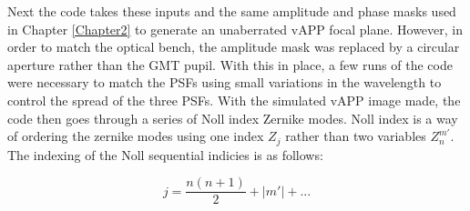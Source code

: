 Next the code takes these inputs and the same amplitude and phase masks used in Chapter \ref{Chapter2} to generate an unaberrated vAPP focal plane.  However, in order to match the optical bench, the amplitude mask was replaced by a circular aperture rather than the GMT pupil.  With this in place, a few runs of the code were necessary to match the PSFs using small variations in the wavelength to control the spread of the three PSFs.  With the simulated vAPP image made, the code then goes through a series of Noll index Zernike modes.  Noll index is a way of ordering the zernike modes using one index $Z_j$ rather than two variables $Z_n^{m'}$\cite{Noll1976ZERNIKETURBULENCE.}.  The indexing of the Noll sequential indicies is as follows:

\begin{equation}
    j = \frac{n(n+1)}{2} + |m'| + ...
    \label{eq:noll}
\end{equation}

